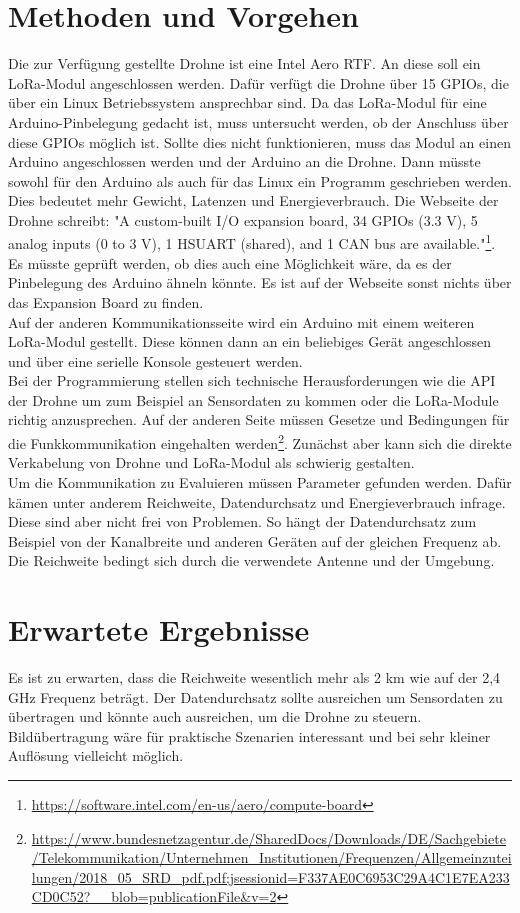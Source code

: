 \section{Methoden und Vorgehen}
Die zur Verfügung gestellte Drohne ist eine Intel Aero RTF. An diese soll ein LoRa-Modul angeschlossen werden. Dafür verfügt die Drohne über 15 GPIOs, die über ein Linux Betriebssystem ansprechbar sind. Da das LoRa-Modul für eine Arduino-Pinbelegung gedacht ist, muss untersucht werden, ob der Anschluss über diese GPIOs möglich ist. Sollte dies nicht funktionieren, muss das Modul an einen Arduino angeschlossen werden und der Arduino an die Drohne. Dann müsste sowohl für den Arduino als auch für das Linux ein Programm geschrieben werden. Dies bedeutet mehr Gewicht, Latenzen und Energieverbrauch. Die Webseite der Drohne schreibt: "A custom-built I/O expansion board, 34 GPIOs (3.3 V), 5 analog inputs (0 to 3 V), 1 HSUART (shared), and 1 CAN bus are available."\footnote{\url{https://software.intel.com/en-us/aero/compute-board}}. Es müsste geprüft werden, ob dies auch eine Möglichkeit wäre, da es der Pinbelegung des Arduino ähneln könnte. Es ist auf der Webseite sonst nichts über das Expansion Board zu finden.\\
Auf der anderen Kommunikationsseite wird ein Arduino mit einem weiteren LoRa-Modul gestellt. Diese können dann an ein beliebiges Gerät angeschlossen und über eine serielle Konsole gesteuert werden.\\
Bei der Programmierung stellen sich technische Herausforderungen wie die API der Drohne um zum Beispiel an Sensordaten zu kommen oder die LoRa-Module richtig anzusprechen. Auf der anderen Seite müssen Gesetze und Bedingungen für die Funkkommunikation eingehalten werden\footnote{\url{https://www.bundesnetzagentur.de/SharedDocs/Downloads/DE/Sachgebiete/Telekommunikation/Unternehmen_Institutionen/Frequenzen/Allgemeinzuteilungen/2018_05_SRD_pdf.pdf;jsessionid=F337AE0C6953C29A4C1E7EA233CD0C52?__blob=publicationFile&v=2}}. Zunächst aber kann sich die direkte Verkabelung von Drohne und LoRa-Modul als schwierig gestalten.\\
Um die Kommunikation zu Evaluieren müssen Parameter gefunden werden. Dafür kämen unter anderem Reichweite, Datendurchsatz und Energieverbrauch infrage. Diese sind aber nicht frei von Problemen. So hängt der Datendurchsatz zum Beispiel von der Kanalbreite und anderen Geräten auf der gleichen Frequenz ab. Die Reichweite bedingt sich durch die verwendete Antenne und der Umgebung.

\section{Erwartete Ergebnisse}
Es ist zu erwarten, dass die Reichweite wesentlich mehr als 2 km wie auf der 2,4 GHz Frequenz beträgt. Der Datendurchsatz sollte ausreichen um Sensordaten zu übertragen und könnte auch ausreichen, um die Drohne zu steuern. Bildübertragung wäre für praktische Szenarien interessant und bei sehr kleiner Auflösung vielleicht möglich.